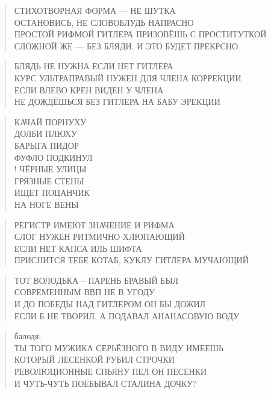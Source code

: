 \poemtitle{***}
\begin{verse}
СТИХОТВОРНАЯ ФОРМА — НЕ ШУТКА\\
ОСТАНОВИСЬ, НЕ СЛОВОБЛУДЬ НАПРАСНО\\
ПРОСТОЙ РИФМОЙ ГИТЛЕРА ПРИЗОВЁШЬ С ПРОСТИТУТКОЙ\\
СЛОЖНОЙ ЖЕ — БЕЗ БЛЯДИ. И ЭТО БУДЕТ ПРЕКРСНО
\end{verse}

\poemtitle{***}
\begin{verse}
БЛЯДЬ НЕ НУЖНА ЕСЛИ НЕТ ГИТЛЕРА\\
КУРС УЛЬТРАПРАВЫЙ НУЖЕН ДЛЯ ЧЛЕНА КОРРЕКЦИИ\\
ЕСЛИ ВЛЕВО КРЕН ВИДЕН У ЧЛЕНА\\
НЕ ДОЖДЁШЬСЯ БЕЗ ГИТЛЕРА НА БАБУ ЭРЕКЦИИ
\end{verse}

\poemtitle{***}
\begin{verse}
КАЧАЙ ПОРНУХУ\\
ДОЛБИ ПЛЮХУ\\
БАРЫГА ПИДОР\\
ФУФЛО ПОДКИНУЛ\\!
ЧЁРНЫЕ УЛИЦЫ\\
ГРЯЗНЫЕ СТЕНЫ\\
ИЩЕТ ПОЦАНЧИК\\
НА НОГЕ ВЕНЫ
\end{verse}

\poemtitle{***}
\begin{verse}
РЕГИСТР ИМЕЮТ ЗНАЧЕНИЕ И РИФМА\\
СЛОГ НУЖЕН РИТМИЧНО ХЛЮПАЮЩИЙ\\
ЕСЛИ НЕТ КАПСА ИЛЬ ШИФТА \\
ПРИСНИТСЯ ТЕБЕ КОТАБ, КУКЛУ ГИТЛЕРА МУЧАЮЩИЙ
\end{verse}

\poemtitle{***}
\begin{verse}
ТОТ ВОЛОДЬКА -- ПАРЕНЬ БРАВЫЙ БЫЛ\\
СОВРЕМЕННЫМ ВВП НЕ В УГОДУ\\
И ДО ПОБЕДЫ НАД ГИТЛЕРОМ ОН БЫ ДОЖИЛ\\
ЕСЛИ Б НЕ ТВОРИЛ, А ПОДАВАЛ АНАНАСОВУЮ ВОДУ
\end{verse}

\poemtitle{***}
\begin{verse}
балодя: \\
ТЫ ТОГО МУЖИКА СЕРЬЁЗНОГО В ВИДУ ИМЕЕШЬ\\
КОТОРЫЙ ЛЕСЕНКОЙ РУБИЛ СТРОЧКИ\\
РЕВОЛЮЦИОННЫЕ СПЬЯНУ ПЕЛ ОН ПЕСЕНКИ\\
И ЧУТЬ-ЧУТЬ ПОЁБЫВАЛ СТАЛИНА ДОЧКУ?
\end{verse}

